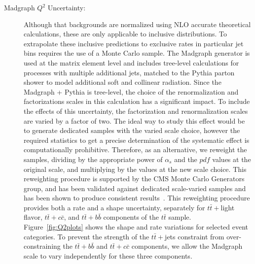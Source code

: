\begin{description}
 \item[Madgraph $Q^2$ Uncertainty:] Although that backgrounds are
   normalized using NLO accurate theoretical calculations, these are
   only applicable to inclusive distributions.  To extrapolate these
   inclusive predictions to exclusive rates in particular jet bins
   requires the use of a Monte Carlo sample.  The {\sc
     Madgraph} generator is used at the matrix element level and
   includes tree-level calculations for processes with multiple
   additional jets, matched to the {\sc Pythia} parton shower to model
   additional soft and collinear radiation.  Since the {\sc Madgraph +
     Pythia} is tree-level, the choice of the renormalization and
   factorizations scales in this calculation has a significant
   impact.  To include the effects of this uncertainty, the
   factorization and renormalization scales are varied by a factor of
   two.  The ideal way to study this effect would be to generate
  dedicated samples with the varied scale choice, however the required
  statistics to get a precise determination of the systematic effect
  is computationally prohibitive.  Therefore, as an alternative, we
  reweight the samples, dividing by the appropriate power of $\alpha_s$
  and the $pdf$ values at the original scale, and multiplying by the
  values at the new scale choice.  This reweighting procedure is supported by
  the CMS Monte Carlo Generators group, and has been validated against
  dedicated scale-varied samples and has been shown to produce consistent
  results~\cite{Q2-REWEIGHT-PRESENTATION}.  This reweighting procedure
  provides both a rate and a shape uncertainty, separately for
  $t\bar{t}+$light flavor, $t\bar{t}+c\bar{c}$, and
  $t\bar{t}+b\bar{b}$ components of the $t\bar{t}$ sample.
  Figure~\ref{fig:Q2plots} shows the shape and rate variations for
  selected event categories.  To prevent the strength of the
  $t\bar{t}+$jets constraint from over-constraining the
  $t\bar{t}+b\bar{b}$ and $t\bar{t}+c\bar{c}$ components, we allow the
  Madgraph scale to vary independently for these three components. 


\end{description}
